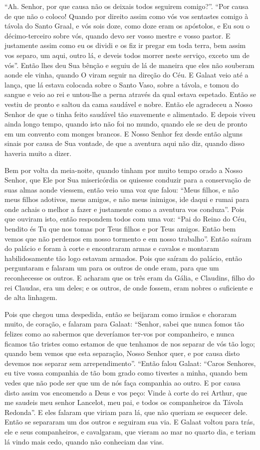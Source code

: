 “Ah. Senhor, por que causa não os deixais todos seguirem comigo?”. “Por causa de
que não o coloco! Quando por direito assim como vós vos sentastes comigo à
távola do Santo Graal, e vós sois doze, como doze eram os apóstolos, e Eu sou o
décimo-terceiro sobre vós, quando devo ser vosso mestre e vosso pastor. E
justamente assim como eu os dividi e os fiz ir pregar em toda terra, bem assim
vos separo, um aqui, outro lá, e deveis todos morrer neste serviço, exceto um
de vós”. Então lhes deu Sua bênção e seguiu de lá de maneira que eles não
souberam aonde ele vinha, quando O viram seguir na direção do Céu. E Galaat 
veio até a lança, que lá estava colocada sobre o Santo Vaso,
sobre a távola, e tomou do sangue e veio ao rei e untou-lhe a perna através da
qual estava espetado. Então se vestiu de pronto e saltou da cama saudável e
nobre. Então ele agradeceu a Nosso Senhor de que o tinha feito saudável tão
suavemente e alimentado. E depois viveu ainda longo tempo, quando isto não foi
no mundo, quando ele se deu de pronto em um convento com monges brancos. E
Nosso Senhor fez desde então alguns sinais por causa de Sua vontade, de que a
aventura aqui não diz, quando disso haveria muito a dizer. 

Bem por volta da meia-noite, quando tinham por muito tempo orado a Nosso Senhor,
que Ele por Sua misericórdia os quisesse conduzir para a conservação de suas
almas aonde viessem, então veio uma voz que falou: “Meus filhos, e não meus
filhos adotivos, meus amigos, e não meus inimigos, ide daqui e rumai para onde
achais o melhor a fazer e justamente como a aventura vos conduza”.
Pois que ouviram isto, então respondem todos com uma voz: “Pai do Reino do Céu,
bendito és Tu que nos tomas por Teus filhos e por Teus amigos. Então bem vemos
que não perdemos em nosso tormento e em nosso trabalho”. Então saíram do
palácio e foram à corte e encontraram armas e cavalos e montaram
habilidosamente tão logo estavam armados. Pois que saíram do palácio, então
perguntaram e falaram um para os outros de onde eram, para que um reconhecesse
os outros. E acharam que os três eram da Gália, e Claudins, filho do rei
Claudas, era um deles; e os outros, de onde fossem, eram nobres o suficiente e
de alta linhagem.

Pois que chegou uma despedida, então se beijaram como irmãos e choraram muito,
de coração, e falaram para Galaat: “Senhor, sabei que nunca fomos tão felizes
como ao sabermos que deveríamos ter-vos por companheiro, e nunca ficamos tão
tristes como estamos de que tenhamos de nos separar de vós tão logo; quando bem
vemos que esta separação, Nosso Senhor quer, e por causa disto devemos nos
separar sem arrependimento”. “Então falou Galaat: “Caros Senhores, eu tive
vossa companhia de tão bom grado como tivestes a minha, quando bem vedes que
não pode ser que um de nós faça companhia ao outro. E por causa disto assim vos
encomendo a Deus e vos peço: Vinde à corte do rei Arthur, que me saudeis meu
senhor Lancelot, meu pai, e todos os companheiros da Távola Redonda”. E eles
falaram que viriam para lá, que não queriam se esquecer dele. Então se
separaram um dos outros e seguiram sua via. E Galaat voltou para trás, ele e
seus companheiros, e cavalgaram, que vieram ao mar no quarto dia, e teriam lá
vindo mais cedo, quando não conheciam das vias.

